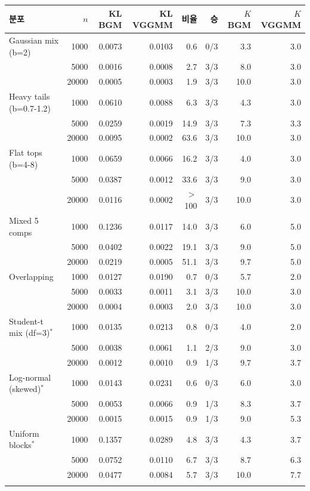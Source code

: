 \begin{tabular}{lrrrrrrr}
\toprule
분포 & $n$ & KL BGM & KL VGGMM & 비율 & 승 & $K$ BGM & $K$ VGGMM \\
\midrule
Gaussian mix (b=2) & 1000 & 0.0073 & 0.0103 & 0.6 & 0/3 & 3.3 & 3.0 \\
 & 5000 & 0.0016 & 0.0008 & 2.7 & 3/3 & 8.0 & 3.0 \\
 & 20000 & 0.0005 & 0.0003 & 1.9 & 3/3 & 10.0 & 3.0 \\
\addlinespace
Heavy tails (b=0.7-1.2) & 1000 & 0.0610 & 0.0088 & 6.3 & 3/3 & 4.3 & 3.0 \\
 & 5000 & 0.0259 & 0.0019 & 14.9 & 3/3 & 7.3 & 3.3 \\
 & 20000 & 0.0095 & 0.0002 & 63.6 & 3/3 & 10.0 & 3.0 \\
\addlinespace
Flat tops (b=4-8) & 1000 & 0.0659 & 0.0066 & 16.2 & 3/3 & 4.0 & 3.0 \\
 & 5000 & 0.0387 & 0.0012 & 33.6 & 3/3 & 9.0 & 3.0 \\
 & 20000 & 0.0116 & 0.0002 & $>$100 & 3/3 & 10.0 & 3.0 \\
\addlinespace
Mixed 5 comps & 1000 & 0.1236 & 0.0117 & 14.0 & 3/3 & 6.0 & 5.0 \\
 & 5000 & 0.0402 & 0.0022 & 19.1 & 3/3 & 9.0 & 5.0 \\
 & 20000 & 0.0219 & 0.0005 & 51.1 & 3/3 & 9.7 & 5.0 \\
\addlinespace
Overlapping & 1000 & 0.0127 & 0.0190 & 0.7 & 0/3 & 5.7 & 2.0 \\
 & 5000 & 0.0033 & 0.0011 & 3.1 & 3/3 & 10.0 & 3.0 \\
 & 20000 & 0.0004 & 0.0003 & 2.0 & 3/3 & 10.0 & 3.0 \\
\addlinespace
Student-t mix (df=3)$^{*}$ & 1000 & 0.0135 & 0.0213 & 0.8 & 0/3 & 4.0 & 2.0 \\
 & 5000 & 0.0038 & 0.0061 & 1.1 & 2/3 & 9.0 & 3.0 \\
 & 20000 & 0.0012 & 0.0010 & 0.9 & 1/3 & 9.7 & 3.7 \\
\addlinespace
Log-normal (skewed)$^{*}$ & 1000 & 0.0143 & 0.0231 & 0.6 & 0/3 & 6.0 & 3.0 \\
 & 5000 & 0.0053 & 0.0066 & 0.9 & 1/3 & 8.3 & 3.7 \\
 & 20000 & 0.0015 & 0.0015 & 0.9 & 1/3 & 9.0 & 5.3 \\
\addlinespace
Uniform blocks$^{*}$ & 1000 & 0.1357 & 0.0289 & 4.8 & 3/3 & 4.3 & 3.7 \\
 & 5000 & 0.0752 & 0.0110 & 6.7 & 3/3 & 8.7 & 6.3 \\
 & 20000 & 0.0477 & 0.0084 & 5.7 & 3/3 & 10.0 & 7.7 \\
\addlinespace
\bottomrule
\end{tabular}